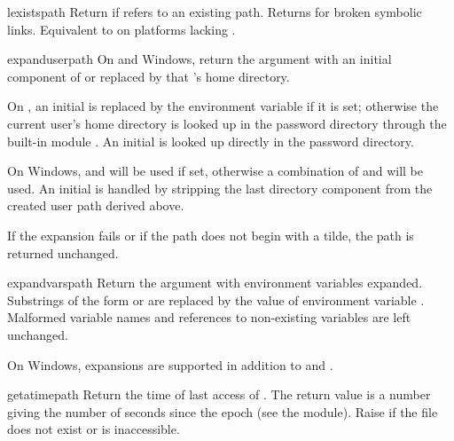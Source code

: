 \begin{funcdesc}{lexists}{path}
Return  if  refers to an existing path.
Returns  for broken symbolic links.  
Equivalent to  on platforms lacking
.
\end{funcdesc}

\begin{funcdesc}{expanduser}{path}
On \UNIX{} and Windows, return the argument with an initial component of
\samp{\~} or  replaced by that 's home directory.

On \UNIX, an initial \samp{\~} is replaced by the environment variable
 if it is set; otherwise the current user's home directory
is looked up in the password directory through the built-in module
.
An initial  is looked up directly in the
password directory.

On Windows,  and  will be used if set,
otherwise a combination of  and  will be
used.  An initial  is handled by stripping the last
directory component from the created user path derived above.

If the expansion fails or if the
path does not begin with a tilde, the path is returned unchanged.
\end{funcdesc}

\begin{funcdesc}{expandvars}{path}
Return the argument with environment variables expanded.  Substrings
of the form  or  are
replaced by the value of environment variable .  Malformed
variable names and references to non-existing variables are left
unchanged.

On Windows,  expansions are supported in addition to
 and .
\end{funcdesc}

\begin{funcdesc}{getatime}{path}
Return the time of last access of .  The return
value is a number giving the number of seconds since the epoch (see the 
 module).  Raise  if the file does
not exist or is inaccessible.
\end{funcdesc}


